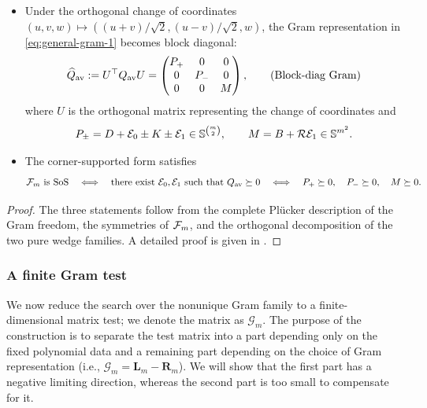 \begin{lemma}
\begin{itemize}
\item Under the orthogonal change of coordinates
$(u,v,w)\mapsto((u+v)/\sqrt2,(u-v)/\sqrt2,w)$, the Gram representation
in \eqref{eq:general-gram-1} becomes block diagonal:
\begin{equation}\label{eq:general-gram-2}
 \widehat Q_{\rm av}
 :=U^\top Q_{\rm av}U
 =
 \begin{pmatrix}
 P_+&0&0\\
 0&P_-&0\\
 0&0&M
 \end{pmatrix},
 \tag{Block-diag Gram}
\end{equation}
where $U$ is the orthogonal matrix representing the change of coordinates 
and
\begin{equation}\label{eq:sectors}
 P_\pm=D+\mathcal E_0\pm K\pm\mathcal E_1
 \in\mathbb S^{\binom m2},
 \qquad
 M=B+\mathcal{R}\mathcal E_1\in\mathbb S^{m^2}.
\end{equation}

\item The corner-supported form satisfies
\[
 \mathcal{F}_m\text{ is SoS}
 \quad\Longleftrightarrow\quad
 \text{there exist }\mathcal E_0,\mathcal E_1
 \text{ such that }Q_{\rm av}\succeq0
 \quad\Longleftrightarrow\quad
 P_+\succeq0,\quad P_-\succeq0,\quad M\succeq0.
\]
\end{itemize}
\end{lemma}

\begin{proof}
The three statements follow from the complete Pl\"ucker description of
the Gram freedom, the symmetries of $\mathcal{F}_m$, and the orthogonal
decomposition of the two pure wedge families.  A detailed proof is
given in .
\end{proof}

\subsubsection{A finite Gram test}\label{subsec:finite-test}

We now reduce the search over the nonunique Gram family to a finite-dimensional
matrix test; we denote the matrix as $ \mathcal G_m$.  The purpose of the construction is to separate the test matrix
into a part depending only on the fixed polynomial data and a remaining part
depending on the choice of Gram representation (i.e., $  \mathcal G_m=\mathbf L_m-\mathbf R_m $).  We will show that the first
part has a negative limiting direction, whereas the second part is too small
to compensate for it. 

